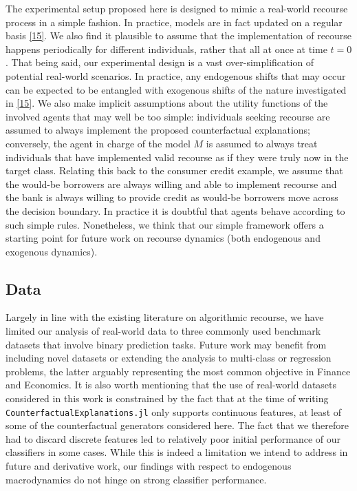 \documentclass[
  conference]{IEEEtran}
\begin{document}
The experimental setup proposed here is designed to mimic a real-world
recourse process in a simple fashion. In practice, models are in fact
updated on a regular basis
\protect\hyperlink{ref-upadhyay2021towards}{{[}15{]}}. We also find it
plausible to assume that the implementation of recourse happens
periodically for different individuals, rather that all at once at time
\(t=0\). That being said, our experimental design is a vast
over-simplification of potential real-world scenarios. In practice, any
endogenous shifts that may occur can be expected to be entangled with
exogenous shifts of the nature investigated in
\protect\hyperlink{ref-upadhyay2021towards}{{[}15{]}}. We also make
implicit assumptions about the utility functions of the involved agents
that may well be too simple: individuals seeking recourse are assumed to
always implement the proposed counterfactual explanations; conversely,
the agent in charge of the model \(M\) is assumed to always treat
individuals that have implemented valid recourse as if they were truly
now in the target class. Relating this back to the consumer credit
example, we assume that the would-be borrowers are always willing and
able to implement recourse and the bank is always willing to provide
credit as would-be borrowers move across the decision boundary. In
practice it is doubtful that agents behave according to such simple
rules. Nonetheless, we think that our simple framework offers a starting
point for future work on recourse dynamics (both endogenous and
exogenous dynamics).

\hypertarget{data}{%
\subsection{Data}\label{data}}

Largely in line with the existing literature on algorithmic recourse, we
have limited our analysis of real-world data to three commonly used
benchmark datasets that involve binary prediction tasks. Future work may
benefit from including novel datasets or extending the analysis to
multi-class or regression problems, the latter arguably representing the
most common objective in Finance and Economics. It is also worth
mentioning that the use of real-world datasets considered in this work
is constrained by the fact that at the time of writing
\texttt{CounterfactualExplanations.jl} only supports continuous
features, at least of some of the counterfactual generators considered
here. The fact that we therefore had to discard discrete features led to
relatively poor initial performance of our classifiers in some cases.
While this is indeed a limitation we intend to address in future and
derivative work, our findings with respect to endogenous macrodynamics
do not hinge on strong classifier performance.
\end{document}
